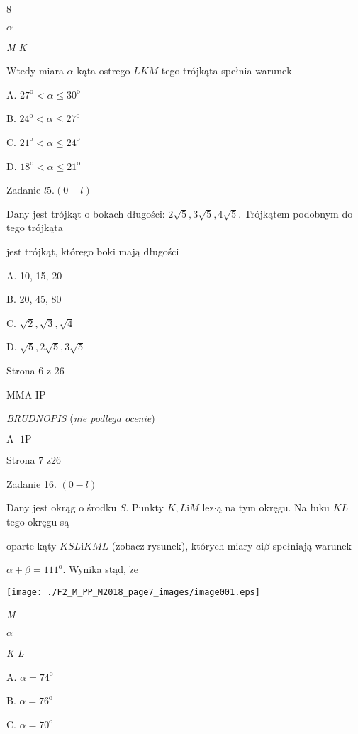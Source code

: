 \documentclass[a4paper,12pt]{article}
\begin{document}
8

$\alpha$

{\it M  K}

Wtedy miara $\alpha$ kąta ostrego $LKM$ tego trójkąta spełnia warunek

A. $27^{\mathrm{o}}<\alpha\leq 30^{\mathrm{o}}$

B. $24^{\mathrm{o}}<\alpha\leq 27^{\mathrm{o}}$

C. $21^{\mathrm{o}}<\alpha\leq 24^{\mathrm{o}}$

D. $18^{\mathrm{o}}<\alpha\leq 21^{\mathrm{o}}$

Zadanie $l5. (0-l)$

Dany jest trójkąt o bokach długości: $2\sqrt{5}, 3\sqrt{5}, 4\sqrt{5}$. Trójkątem podobnym do tego trójkąta

jest trójkąt, którego boki mają długości

A. 10, 15, 20

B. 20, 45, 80

C. $\sqrt{2}, \sqrt{3}, \sqrt{4}$

D. $\sqrt{5}, 2\sqrt{5}, 3\sqrt{5}$

Strona 6 z 26

MMA-IP





{\it BRUDNOPIS} ({\it nie podlega ocenie})

$\mathrm{A}_{-}1\mathrm{P}$

Strona 7 z26





Zadanie 16. $(0-l)$

Dany jest okrąg o środku $S$. Punkty $K, L\mathrm{i}M$ lez$\cdot$ą na tym okręgu. Na łuku $KL$ tego okręgu są

oparte kąty $KSL \mathrm{i} KML$ (zobacz rysunek), których miary $a \mathrm{i} \beta$ spełniają warunek

$\alpha+\beta=111^{\mathrm{o}}$. Wynika stąd, $\dot{\mathrm{z}}\mathrm{e}$
\begin{center}
\texttt{[image: ./F2\_M\_PP\_M2018\_page7\_images/image001.eps]}
\end{center}
{\it M}

$\alpha$

{\it K  L}

A. $\alpha=74^{\mathrm{o}}$

B. $\alpha=76^{\mathrm{o}}$

C. $\alpha=70^{\mathrm{o}}$
\end{document}
